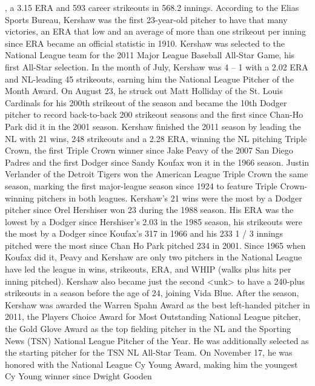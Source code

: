 , a 3.15 ERA and 593 career strikeouts in 568.2 innings. According to the Elias Sports Bureau, Kershaw was the first 23-year-old pitcher to have that many victories, an ERA that low and an average of more than one strikeout per inning since ERA became an official statistic in 1910. 
Kershaw was selected to the National League team for the 2011 Major League Baseball All-Star Game, his first All-Star selection. In the month of July, Kershaw was 4 – 1 with a 2.02 ERA and NL-leading 45 strikeouts, earning him the National League Pitcher of the Month Award. On August 23, he struck out Matt Holliday of the St. Louis Cardinals for his 200th strikeout of the season and became the 10th Dodger pitcher to record back-to-back 200 strikeout seasons and the first since Chan-Ho Park did it in the 2001 season. 
Kershaw finished the 2011 season by leading the NL with 21 wins, 248 strikeouts and a 2.28 ERA, winning the NL pitching Triple Crown, the first Triple Crown winner since Jake Peavy of the 2007 San Diego Padres and the first Dodger since Sandy Koufax won it in the 1966 season. Justin Verlander of the Detroit Tigers won the American League Triple Crown the same season, marking the first major-league season since 1924 to feature Triple Crown-winning pitchers in both leagues. Kershaw's 21 wins were the most by a Dodger pitcher since Orel Hershiser won 23 during the 1988 season. His ERA was the lowest by a Dodger since Hershiser's 2.03 in the 1985 season, his strikeouts were the most by a Dodger since Koufax's 317 in 1966 and his 233 1 / 3 innings pitched were the most since Chan Ho Park pitched 234 in 2001. Since 1965 when Koufax did it, Peavy and Kershaw are only two pitchers in the National League have led the league in wins, strikeouts, ERA, and WHIP (walks plus hits per inning pitched). Kershaw also became just the second <unk> to have a 240-plus strikeouts in a season before the age of 24, joining Vida Blue. 
After the season, Kershaw was awarded the Warren Spahn Award as the best left-handed pitcher in 2011, the Players Choice Award for Most Outstanding National League pitcher, the Gold Glove Award as the top fielding pitcher in the NL and the Sporting News (TSN) National League Pitcher of the Year. He was additionally selected as the starting pitcher for the TSN NL All-Star Team. On November 17, he was honored with the National League Cy Young Award, making him the youngest Cy Young winner since Dwight Gooden 
